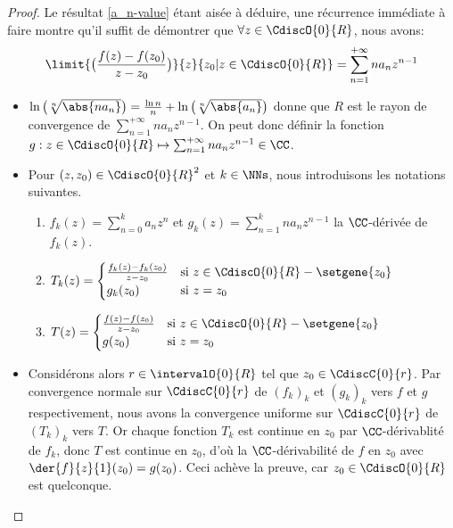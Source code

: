 \begin{proof}
	Le résultat \ref{a_n-value} étant aisée à déduire, une récurrence immédiate à faire montre qu'il suffit de démontrer que
	$\forall z \in \CdiscO{0}{R}$, nous avons:
	\[
    	  \limit{\big( \frac{f(z) - f(z_0)}{z - z_0} \big)}%
    	        {z}{z_0 | z \in \CdiscO{0}{R}}
    	= \sum_{n = 1}^{+\infty} n a_n z^{n - 1}
	\]
	\begin{itemize}
		\item
		$ \ln \big( \sqrt[n]{\abs{n a_n}} \big)
		= \frac{\ln n}{n} + \ln \big( \sqrt[n]{\abs{a_n}} \big)$
		donne que
		$R$ est le rayon de convergence de
		$\sum_{n = 1}^{+\infty} n a_n z^{n - 1}$.
		On peut donc définir la fonction $g: z \in \CdiscO{0}{R} \mapsto \sum_{n = 1}^{+\infty} n a_n z^{n - 1} \in \CC$.


		\item Pour $(z , z_0) \in \CdiscO{0}{R}^2$ et $k \in \NNs$, nous introduisons les notations suivantes.
        \begin{enumerate}[label=(\alph*)]
	        \item $f_k(z) = \sum_{n = 0}^{k} a_n z^n$
	        et
	        $g_k(z) = \sum_{n = 1}^{k} n a_n z^{n-1}$ la $\CC$-dérivée de $f_k(z)$.

	        \item $T_k(z) =
			\begin{cases}
	    		  \frac{f_k(z) - f_k(z_0)}{z - z_0}
				& \text{si $z \in \CdiscO{0}{R} - \setgene{z_0}$}
				\\
	   			  g_k(z_0) 
				& \text{si $z = z_0$}
	 		\end{cases}$

	        \item $T(z) =
			\begin{cases}
	    		  \frac{f(z) - f(z_0)}{z - z_0} 
				& \text{si $z \in \CdiscO{0}{R} - \setgene{z_0}$}
				\\
	   			  g(z_0)
				& \text{si $z = z_0$}
	 		\end{cases}$
	    \end{enumerate}


		\item Considérons alors $r \in \intervalO{0}{R}$ tel que $z_0 \in \CdiscC{0}{r}$.
		Par convergence normale sur $\CdiscC{0}{r}$ de $(f_k)_k$ et $(g_k)_k$ vers $f$ et $g$ respectivement,
		nous avons la convergence uniforme sur $\CdiscC{0}{r}$ de $(T_k)_k$ vers $T$. 
		Or chaque fonction $T_k$ est continue en $z_0$ par $\CC$-dérivablité de $f_k$, donc $T$ est continue en $z_0$,
		d'où
		la $\CC$-dérivabilité de  $f$ en $z_0$ avec $\der{f}{z}{1}(z_0) = g(z_0)$.
		Ceci achève la preuve, car $z_0 \in \CdiscO{0}{R}$ est quelconque.
	\end{itemize}

	\null\vspace{-6ex}
\end{proof}


